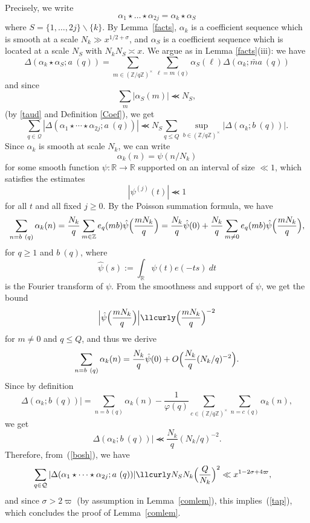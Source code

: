 \documentclass[12pt,a4paper,reqno]{amsart}
\numberwithin{equation}{section}
\theoremstyle{plain}
\theoremstyle{definition}
\newcommand\R{\mathbb{R}}
\newcommand\Z{\mathbb{Z}}
\renewcommand{\sim}{\asymp}
\renewcommand{\lessapprox}{\llcurly}
\begin{document}
Precisely, we write
$$
\alpha_1 \star \ldots \star \alpha_{2j}=\alpha_k \star
\alpha_S
$$
where $S=\{1,\ldots,2j\}\backslash \{k\}$. By Lemma~\ref{facts},
$\alpha_k$ is a coefficient sequence which is smooth at a scale $N_k
\gg x^{1/2+\sigma}$, and $\alpha_S$ is a coefficient sequence which is
located at a scale $N_S$ with $N_k N_S \sim x$.  We argue as in Lemma
\ref{facts}(iii):
we have
$$ 
\Delta(\alpha_k \star \alpha_S; a\ (q)) = \sum_{m\in
  (\Z/q\Z)^{\times}} \sum_{\ell = m\ (q)} \alpha_S(\ell) \Delta(\alpha_k; \bar{m} a\ (q))
$$
and since
$$ \sum_m |\alpha_S(m)| \lessapprox  N_S,$$
(by \eqref{taud} and Definition \ref{Coef}), we get
\begin{equation}\label{bosh}
  \sum_{q\in\mathcal{Q}}|\Delta(\alpha_1\star\cdots\star\alpha_{2j};a\ (q))|
  \lessapprox N_S \sum_{q \leq Q} 
  \sup_{b \in (\Z/q\Z)^\times} |\Delta(\alpha_k;b\ (q))|.
 \end{equation}
Since $\alpha_k$ is smooth at scale $N_k$, we can write
$$ \alpha_k(n) = \psi( n / N_k ) $$
for some smooth function $\psi \colon \R \to \R$ supported on an
interval of size $\ll 1$, which satisfies the estimates
$$
|\psi^{(j)}(t)| \lessapprox 1
$$
for all $t$ and all fixed $j \geq 0$.  By the Poisson summation
formula, we have
$$
\sum_{n = b\ (q)} \alpha_k(n) = \frac{N_k}{q} \sum_{m \in \Z} e_q(mb)
\hat \psi\Bigl( \frac{m N_k}{q}\Bigr)= \frac{N_k}{q}\hat{\psi}(0)+
\frac{N_k}{q} \sum_{m \neq 0}e_q(mb) \hat \psi\Bigl( \frac{m
  N_k}{q}\Bigr),
$$ 
for $q\geq 1$ and $b\ (q)$, where
$$
\hat \psi(s) := \int_\R \psi(t) e(-ts)\ dt
$$ 
is the Fourier transform of $\psi$.  From the smoothness and support
of $\psi$, we get the bound
$$
\Bigl|\hat\psi\Bigl(\frac{m N_k}{q}\Bigr)\Bigr| \lessapprox
\Bigl(\frac{mN_k}{q}\Bigr)^{-2}
$$ 
for $m \neq 0$ and $q\leq Q$, and thus we derive
$$ 
\sum_{n = b\ (q)} \alpha_k(n)= \frac{N_k}{q}\hat{\psi}(0)
+O\Bigl(\frac{N_k}{q} (N_k/q)^{-2}\Bigr).
$$ 
Since by definition
$$
\Delta(\alpha_k;b\ (q))|=
\sum_{n = b\ (q)} \alpha_k(n)
-\frac{1}{\varphi(q)}\sum_{c\in(\Z/q\Z)^{\times}} \sum_{n=c\
  (q)}\alpha_k(n),
$$
we get
$$ 
\Delta(\alpha_k;b\ (q))| \lessapprox \frac{N_k}{q} (N_k/q)^{-2}.
$$
Therefore, from~(\ref{bosh}), we have
\begin{align*}
  \sum_{q\in\mathcal{Q}} |\Delta(\alpha_1\star\cdots\star\alpha_{2j};a\ (q))| &
  \lessapprox N_SN_k\Bigl(\frac{Q}{N_k}\Bigr)^2\ll x^{1-2\sigma+4\varpi},
\end{align*}
and since $\sigma>2\varpi$ (by assumption in Lemma~\ref{comlem}), this
implies~(\ref{tap}), which concludes the proof  of Lemma~\ref{comlem}.
\end{document}
